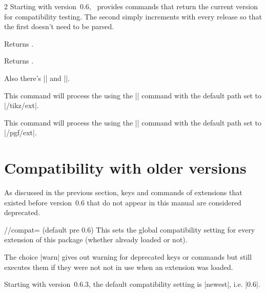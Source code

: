 \begin{multicols}{2}
Starting with version~0.6,
\tikzextname\ provides commands that return the current version for compatibility testing.
The second simply increments with every release
so that the first doesn't need to be parsed.
\begin{command}{\tikzextversion}
  Returns \texttt{\tikzextversion}.
\end{command}
\begin{command}{\tikzextversionnumber}
  Returns \texttt{\tikzextversionnumber}.
\end{command}
%
Also there's |\tikzextset| and |\pgfextset|.
\begin{command}{\tikzextset{}}
  This command will process the  using the
  |\pgfkeys| command with the default path set to |/tikz/ext|.
\end{command}
\begin{command}{\pgfextset{}}
  This command will process the  using the
  |\pgfkeys| command with the default path set to |/pgf/ext|.
\end{command}

\newcolumn
\section{Compatibility with older versions}
As discussed in the previous section,
keys and commands of extensions that existed before version~0.6
that do not appear in this manual are considered deprecated.

\begin{key}{/\tikzext/compat= (default pre 0.6)}
  This sets the global compatibility setting for every extension of this package
  (whether already loaded or not).

  The choice |warn| gives out warning for deprecated keys or commands
  but still executes them if they were not not in use when an extension was loaded.
  
  Starting with version~0.6.3, the default compatibility setting is |newest|, i.e. |0.6|.
  

\end{key}
\end{multicols}
